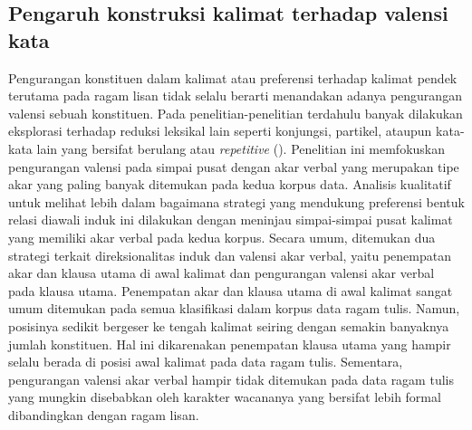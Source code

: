 \subsection{Pengaruh konstruksi kalimat terhadap valensi kata}

Pengurangan konstituen dalam kalimat atau preferensi terhadap kalimat pendek terutama pada ragam lisan tidak selalu berarti menandakan adanya pengurangan valensi sebuah konstituen. Pada penelitian-penelitian terdahulu banyak dilakukan eksplorasi terhadap reduksi leksikal lain seperti konjungsi, partikel, ataupun kata-kata lain yang bersifat berulang atau \textit{repetitive} (\citealp{jaeger2006redundancy, gildea2015human}). Penelitian ini memfokuskan pengurangan valensi pada simpai pusat dengan akar verbal yang merupakan tipe akar yang paling banyak ditemukan pada kedua korpus data. Analisis kualitatif untuk melihat lebih dalam bagaimana strategi yang mendukung preferensi bentuk relasi diawali induk ini dilakukan dengan meninjau simpai-simpai pusat kalimat yang memiliki akar verbal pada kedua korpus. Secara umum, ditemukan dua strategi terkait direksionalitas induk dan valensi akar verbal, yaitu penempatan akar dan klausa utama di awal kalimat dan pengurangan valensi akar verbal pada klausa utama. Penempatan akar dan klausa utama di awal kalimat sangat umum ditemukan pada semua klasifikasi dalam korpus data ragam tulis. Namun, posisinya sedikit bergeser ke tengah kalimat seiring dengan semakin banyaknya jumlah konstituen. Hal ini dikarenakan penempatan klausa utama yang hampir selalu berada di posisi awal kalimat pada data ragam tulis. Sementara, pengurangan valensi akar verbal hampir tidak ditemukan pada data ragam tulis yang mungkin disebabkan oleh karakter wacananya yang bersifat lebih formal dibandingkan dengan ragam lisan. 

